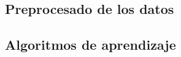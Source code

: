 \documentclass{article}
\begin{document}
\subsection{Preprocesado de los datos}






\subsection{Algoritmos de aprendizaje}



\end{document}
